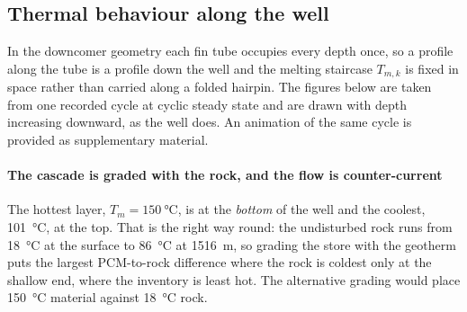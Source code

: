 %
%
%
%
%
\subsection{Thermal behaviour along the well}
\label{sec:res-thermal}

In the downcomer geometry each fin tube occupies every depth once, so a
profile along the tube is a profile down the well and the melting staircase
$T_{m,k}$ is fixed in space rather than carried along a folded hairpin. The
figures below are taken from one recorded cycle at cyclic steady state and
are drawn with depth increasing downward, as the well does. An animation of
the same cycle is provided as supplementary material.

\paragraph{The cascade is graded with the rock, and the flow is
counter-current} The hottest layer, $T_{m}=\SI{150}{\celsius}$, is at the
\emph{bottom} of the well and the coolest, \SI{101}{\celsius}, at the top.
That is the right way round: the undisturbed rock runs from
\SI{18}{\celsius} at the surface to \SI{86}{\celsius} at
\SI{1516}{\metre}, so grading the store with the geotherm puts the largest
PCM-to-rock difference where the rock is coldest only at the shallow end,
where the inventory is least hot. The alternative grading would place
\SI{150}{\celsius} material against \SI{18}{\celsius} rock.

